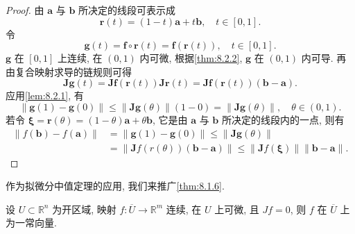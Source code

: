 \begin{proof}
由 $\boldsymbol{a}$ 与 $\boldsymbol{b}$ 所决定的线段可表示成
\[
  \boldsymbol{r}(t) = (1 - t)\boldsymbol{a} + t\boldsymbol{b}, \quad t \in [0, 1].
\]
令
\[
  \boldsymbol{g}(t) = \boldsymbol{f} \circ \boldsymbol{r}(t) = \boldsymbol{f}(\boldsymbol{r}(t)), \quad t \in [0, 1].
\]
$\boldsymbol{g}$ 在 $[0, 1]$ 上连续, 在 $(0, 1)$ 内可微, 根据\cref{thm:8.2.2}, $\boldsymbol{g}$ 在 $(0, 1)$ 内可导. 再由复合映射求导的链规则可得
\[
  \boldsymbol{J}\boldsymbol{g}(t) = \boldsymbol{J}\boldsymbol{f}(\boldsymbol{r}(t))\boldsymbol{J}\boldsymbol{r}(t) = \boldsymbol{J}\boldsymbol{f}(\boldsymbol{r}(t))(\boldsymbol{b} - \boldsymbol{a}).
\]
应用\cref{lem:8.2.1}, 有
\[
  \|\boldsymbol{g}(1) - \boldsymbol{g}(0)\| \leqslant \|\boldsymbol{J}\boldsymbol{g}(\theta)\|(1 - 0) = \|\boldsymbol{J}\boldsymbol{g}(\theta)\|, \quad \theta \in (0, 1).
\]
若令 $\boldsymbol{\xi} = \boldsymbol{r}(\theta) = (1 - \theta)\boldsymbol{a} + \theta\boldsymbol{b}$, 它是由 $\boldsymbol{a}$ 与 $\boldsymbol{b}$ 所决定的线段内的一点, 则有
\begin{align*}
  \|f(\boldsymbol{b}) - f(\boldsymbol{a})\| &= \|\boldsymbol{g}(1) - \boldsymbol{g}(0)\| \leqslant \|\boldsymbol{J}\boldsymbol{g}(\theta)\| \\
  &= \|\boldsymbol{J}f(r(\theta))(\boldsymbol{b} - \boldsymbol{a})\| \leqslant \|\boldsymbol{J}f(\boldsymbol{\xi})\|\|\boldsymbol{b} - \boldsymbol{a}\|.
\end{align*}
\end{proof}

作为拟微分中值定理的应用, 我们来推广\cref{thm:8.1.6}.

\begin{theorem}\label{thm:8.2.10}
设 $U \subset \mathbb{R}^{n}$ 为开区域, 映射 $f: \overline{U} \to \mathbb{R}^{m}$ 连续, 在 $U$ 上可微, 且 $Jf = 0$, 则 $f$ 在 $\overline{U}$ 上为一常向量.
\end{theorem}


